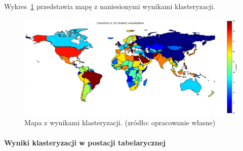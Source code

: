 \documentclass[11pt]{report}
\begin{document}
    Wykres~\ref{fig:clust10} przedstawia mapę z naniesionymi wynikami klasteryzacji.

    \begin{figure}[ht]
        \centering
        \includegraphics[width=1 \textwidth]{fig/CLUST/10clusterMap.png}
        \caption{Mapa z wynikami klasteryzacji. (zródło: opracowanie własne)}
        \label{fig:clust10}
    \end{figure}

    \paragraph{Wyniki klasteryzacji w postacji tabelarycznej}
\end{document}
